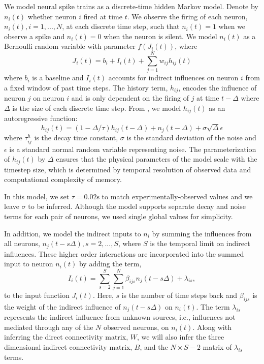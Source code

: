 \documentclass{article}
\begin{document}
We model neural spike trains as a discrete-time hidden Markov model.
Denote by $ n_i(t) $ whether neuron $i$ fired at time $t$. We observe
the firing of each neuron, $n_i(t), i = 1,...,N$, at each discrete
time step, such that $n_i(t) = 1$ when we observe a spike and $n_i(t)
= 0$ when the neuron is silent. We model $n_i(t)$ as a Bernoulli
random variable with parameter $f(J_i(t))$, where
\begin{equation}
\label{J} J_i(t) = b_i + I_i(t) + \sum_{j=1}^{N} w_{ij}h_{ij}(t)
\end{equation}
where $b_i$ is a baseline and $I_i(t)$ accounts for indirect
influences on neuron $i$ from a fixed window of past time steps.
The history term, $h_{ij}$, encodes the influence of neuron $j$ on
neuron $i$ and is only dependent on the firing of $j$ at time
$t-\Delta$ where $\Delta$ is the size of each discrete time step.
From \citep{mishchencko2011}, we model $h_{ij}(t)$ as an autoregressive
function:
\begin{equation}
\label{h} h_{ij}(t) = (1-\Delta/\tau)h_{ij}(t-\Delta)
  + n_j(t-\Delta)+\sigma\sqrt{\Delta}\epsilon
\end{equation}
where $ \tau_{ij}^h $ is the decay time constant, $\sigma$
is the standard deviation of the noise and $\epsilon$ is a
standard normal random variable representing noise.  The parameterization
of $h_{ij}(t)$ by $\Delta$ ensures that the physical parameters of
the model scale with the timestep size, which is determined by
temporal resolution of observed data and computational complexity
of memory.

In this model, we set $\tau = 0.02\text{s}$ to match
experimentally-observed values \citep{mishchencko2011} and we leave
$\sigma$ to be inferred. Although the model supports separate decay
and noise terms for each pair of neurons, we used single global
values for simplicity.


In addition, we model the indirect inputs to $n_i$ by summing the
influences from all neurons, $n_j(t-s\Delta), s=2,...,S$, where $S$
is the temporal limit on indirect influences. These higher order
interactions are incorporated into the summed input to neuron
$n_i(t)$ by adding the term,
\begin{equation}
\label{new_term}
I_i(t)=\displaystyle\sum\limits_{s=2}^S\sum\limits_{j=1}^N \beta_{ijs}n_j(t-s\Delta) + \lambda_{is},
\end{equation}
to the input function $J_i(t)$. Here, $s$ is the number of time
steps back and $\beta_{ijs}$ is the weight of the indirect influence
of $n_j(t-s\Delta)$ on $n_i(t)$. The term $\lambda_{is}$ represents
the indirect influence from unknown sources, i.e., influences not
mediated through any of the $N$ observed neurons, on $n_i(t)$.
Along with inferring the direct connectivity matrix, $W$, we will
also infer the three dimensional indirect connectivity matrix, $B$,
and the $N\times S-2$ matrix of $\lambda_{is}$ terms.
\end{document}
